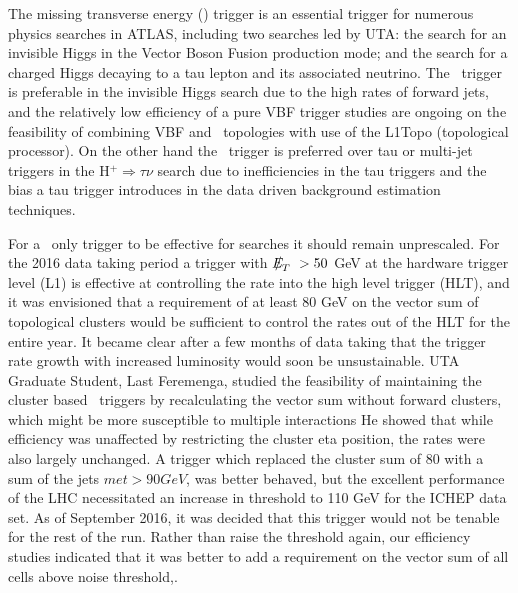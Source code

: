 The missing transverse energy (\met) trigger is an essential trigger for numerous physics searches in ATLAS, including two searches led by UTA:  the search for an invisible Higgs in the Vector Boson Fusion production mode; and the search for a charged Higgs decaying to a tau lepton and its associated neutrino.   The \met\ trigger is preferable in the invisible Higgs search due to the high rates of forward jets, and the relatively low efficiency of a pure VBF trigger studies are ongoing on the feasibility of combining VBF and \met\ topologies with use of the L1Topo         (topological processor).  On the other hand the \met\ trigger is preferred over tau or multi-jet triggers in the H$^+ \Rightarrow\tau\nu$ search due to inefficiencies in the tau triggers and the bias a tau trigger introduces in the data driven background estimation techniques.

For a \met\ only trigger to be effective for searches it should remain unprescaled.
For the 2016 data taking period a trigger with $\met> 50$ GeV at the hardware trigger level (L1) is effective at controlling the rate into the high level trigger (HLT), and it was envisioned that a requirement of at least 80 GeV on the vector sum of topological clusters would be sufficient to control the rates out of the HLT for the entire year. It became clear after a few months of data taking that the trigger rate growth with increased luminosity would soon be unsustainable.   UTA Graduate Student, Last Feremenga, studied the feasibility of maintaining the cluster based \met\ triggers by recalculating the vector sum without forward clusters, which might be more susceptible to multiple interactions He showed that while efficiency was unaffected by restricting the cluster eta position, the rates were also largely unchanged.  A trigger which replaced the cluster sum of 80 with a sum of the jets 
$ met>90 GeV$, was better behaved, but the excellent performance of the LHC necessitated an increase in threshold to 110 GeV for the ICHEP data set.  As of September 2016, it was decided that this trigger would not be tenable for the rest of the run. Rather than raise the threshold again, our efficiency studies indicated that it was better to add a requirement on the vector sum of all cells above noise threshold,.


